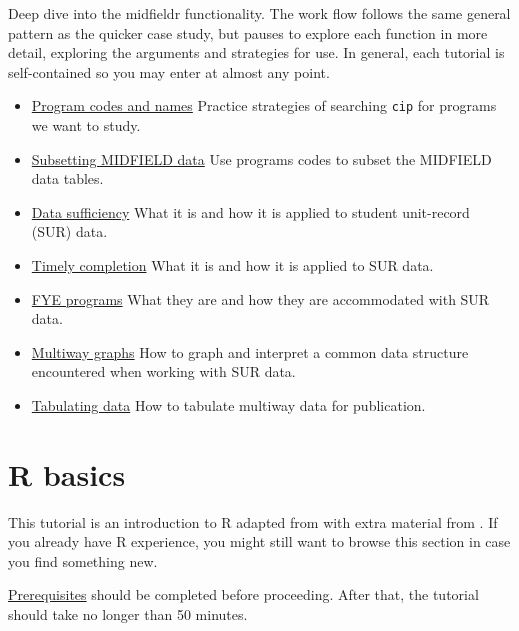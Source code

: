 \documentclass[
]{book}
\providecommand{\tightlist}{%
  \setlength{\itemsep}{0pt}\setlength{\parskip}{0pt}}
\begin{document}
Deep dive into the midfieldr functionality. The work flow follows the same general pattern as the quicker case study, but pauses to explore each function in more detail, exploring the arguments and strategies for use. In general, each tutorial is self-contained so you may enter at almost any point.

\begin{itemize}
\tightlist
\item
  \href{https://midfieldr.github.io/midfieldr/articles/art-010-program-codes.html}{Program codes and names} Practice strategies of searching \texttt{cip} for programs we want to study.
\item
  \href{https://midfieldr.github.io/midfieldr/articles/art-015-subsetting-midfield-data.html}{Subsetting MIDFIELD data} Use programs codes to subset the MIDFIELD data tables.
\item
  \href{https://midfieldr.github.io/midfieldr/articles/art-020-data-sufficiency.html}{Data sufficiency} What it is and how it is applied to student unit-record (SUR) data.
\item
  \href{https://midfieldr.github.io/midfieldr/articles/art-030-timely-completion.html}{Timely completion} What it is and how it is applied to SUR data.
\item
  \href{https://midfieldr.github.io/midfieldr/articles/art-040-fye-programs.html}{FYE programs} What they are and how they are accommodated with SUR data.
\item
  \href{https://midfieldr.github.io/midfieldr/articles/art-050-multiway-graphs.html}{Multiway graphs} How to graph and interpret a common data structure encountered when working with SUR data.
\item
  \href{https://midfieldr.github.io/midfieldr/articles/art-060-tabulating-data.html}{Tabulating data} How to tabulate multiway data for publication.
\end{itemize}

\hypertarget{r-basics}{%
\section{R basics}\label{r-basics}}

This tutorial is an introduction to R adapted from \citep{Healy:2019:Ch.2} with extra material from \citep{Matloff:2019}. If you already have R experience, you might still want to browse this section in case you find something new.

\protect\hyperlink{prerequisites}{Prerequisites} should be completed before proceeding. After that, the tutorial should take no longer than 50 minutes.
\end{document}
